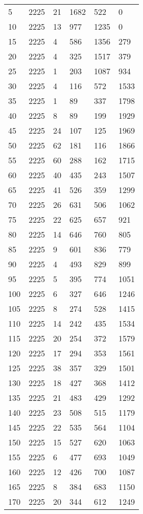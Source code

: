 \begin{longtable}{|l|l|l|l|l|l|}
5 & 2225 & 21 & 1682 & 522 & 0 \\
10 & 2225 & 13 & 977 & 1235 & 0 \\
15 & 2225 & 4 & 586 & 1356 & 279 \\
20 & 2225 & 4 & 325 & 1517 & 379 \\
25 & 2225 & 1 & 203 & 1087 & 934 \\
30 & 2225 & 4 & 116 & 572 & 1533 \\
35 & 2225 & 1 & 89 & 337 & 1798 \\
40 & 2225 & 8 & 89 & 199 & 1929 \\
45 & 2225 & 24 & 107 & 125 & 1969 \\
50 & 2225 & 62 & 181 & 116 & 1866 \\
55 & 2225 & 60 & 288 & 162 & 1715 \\
60 & 2225 & 40 & 435 & 243 & 1507 \\
65 & 2225 & 41 & 526 & 359 & 1299 \\
70 & 2225 & 26 & 631 & 506 & 1062 \\
75 & 2225 & 22 & 625 & 657 & 921 \\
80 & 2225 & 14 & 646 & 760 & 805 \\
85 & 2225 & 9 & 601 & 836 & 779 \\
90 & 2225 & 4 & 493 & 829 & 899 \\
95 & 2225 & 5 & 395 & 774 & 1051 \\
100 & 2225 & 6 & 327 & 646 & 1246 \\
105 & 2225 & 8 & 274 & 528 & 1415 \\
110 & 2225 & 14 & 242 & 435 & 1534 \\
115 & 2225 & 20 & 254 & 372 & 1579 \\
120 & 2225 & 17 & 294 & 353 & 1561 \\
125 & 2225 & 38 & 357 & 329 & 1501 \\
130 & 2225 & 18 & 427 & 368 & 1412 \\
135 & 2225 & 21 & 483 & 429 & 1292 \\
140 & 2225 & 23 & 508 & 515 & 1179 \\
145 & 2225 & 22 & 535 & 564 & 1104 \\
150 & 2225 & 15 & 527 & 620 & 1063 \\
155 & 2225 & 6 & 477 & 693 & 1049 \\
160 & 2225 & 12 & 426 & 700 & 1087 \\
165 & 2225 & 8 & 384 & 683 & 1150 \\
170 & 2225 & 20 & 344 & 612 & 1249 \\

\end{longtable}
